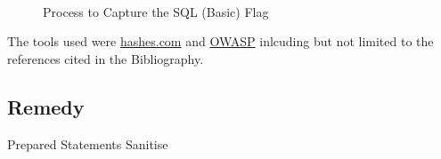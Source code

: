 \begin{figure}[!htb]
    \centering
     \quad
     \\
     \quad
    \caption[Flag 00 Method]{Process to Capture the SQL (Basic) Flag} %
    \label{fig:flag00 method}
\end{figure}
The tools used were \href{https://hashes.com/en}{hashes.com} and \href{https://www.owasp.org/index.php/SQL\_Injection}{OWASP} inlcuding
but not limited to the references cited in the Bibliography.

\subsection{Remedy}

Prepared Statements
Sanitise